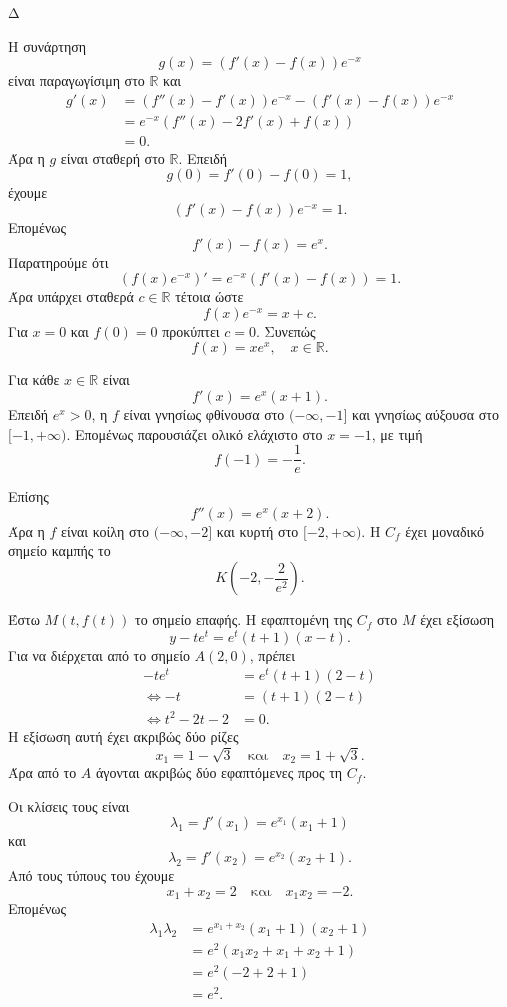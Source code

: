 \begin{thema}{Δ}
\begin{erwthma}
\item Η συνάρτηση
\[
g(x)=\left(f'(x)-f(x)\right)e^{-x}
\]
είναι παραγωγίσιμη στο $\mathbb{R}$ και
\begin{align*}
g'(x)
&=\left(f''(x)-f'(x)\right)e^{-x}
-\left(f'(x)-f(x)\right)e^{-x}\\
&=e^{-x}\left(f''(x)-2f'(x)+f(x)\right)\\
&=0.
\end{align*}
Άρα η $g$ είναι σταθερή στο $\mathbb{R}$. Επειδή
\[
g(0)=f'(0)-f(0)=1,
\]
έχουμε
\[
\left(f'(x)-f(x)\right)e^{-x}=1.
\]
Επομένως
\[
f'(x)-f(x)=e^x.
\]
Παρατηρούμε ότι
\[
\left(f(x)e^{-x}\right)'
=e^{-x}\left(f'(x)-f(x)\right)
=1.
\]
Άρα υπάρχει σταθερά $c\in\mathbb{R}$ τέτοια ώστε
\[
f(x)e^{-x}=x+c.
\]
Για $x=0$ και $f(0)=0$ προκύπτει $c=0$. Συνεπώς
\[
{f(x)=xe^x},
\quad x\in\mathbb{R}.
\]

\item Για κάθε $x\in\mathbb{R}$ είναι
\[
f'(x)=e^x(x+1).
\]
Επειδή $e^x>0$, η $f$ είναι γνησίως φθίνουσα στο $(-\infty,-1]$ και γνησίως αύξουσα στο $[-1,+\infty)$. Επομένως παρουσιάζει ολικό ελάχιστο στο $x=-1$, με τιμή
\[
{f(-1)=-\frac{1}{e}}.
\]

Επίσης
\[
f''(x)=e^x(x+2).
\]
Άρα η $f$ είναι κοίλη στο $(-\infty,-2]$ και κυρτή στο $[-2,+\infty)$. Η $C_f$ έχει μοναδικό σημείο καμπής το
\[
{K\left(-2,-\frac{2}{e^2}\right)}.
\]

\item Έστω $M(t,f(t))$ το σημείο επαφής. Η εφαπτομένη της $C_f$ στο $M$ έχει εξίσωση
\[
y-te^t=e^t(t+1)(x-t).
\]
Για να διέρχεται από το σημείο $A(2,0)$, πρέπει
\begin{align*}
-te^t&=e^t(t+1)(2-t)\\
\Leftrightarrow -t&=(t+1)(2-t)\\
\Leftrightarrow t^2-2t-2&=0.
\end{align*}
Η εξίσωση αυτή έχει ακριβώς δύο ρίζες
\[
{x_1=1-\sqrt{3}}
\quad\text{και}\quad
{x_2=1+\sqrt{3}}.
\]
Άρα από το $A$ άγονται ακριβώς δύο εφαπτόμενες προς τη $C_f$.

Οι κλίσεις τους είναι
\[
\lambda_1=f'(x_1)=e^{x_1}(x_1+1)
\]
και
\[
\lambda_2=f'(x_2)=e^{x_2}(x_2+1).
\]
Από τους τύπους του  έχουμε
\[
x_1+x_2=2
\quad\text{και}\quad
x_1x_2=-2.
\]
Επομένως
\begin{align*}
\lambda_1\lambda_2
&=e^{x_1+x_2}(x_1+1)(x_2+1)\\
&=e^2\left(x_1x_2+x_1+x_2+1\right)\\
&=e^2(-2+2+1)\\
&={e^2}.
\end{align*}


\end{erwthma}
\end{thema}
